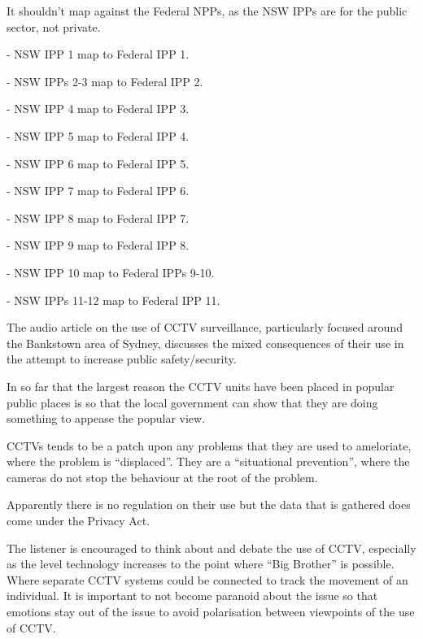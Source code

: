 
It shouldn't map against the Federal NPPs, as the NSW IPPs are for the public sector, not private.

\item - NSW IPP 1 map to Federal IPP 1.
\item - NSW IPPs 2-3 map to Federal IPP 2.
\item - NSW IPP 4 map to Federal IPP 3.
\item - NSW IPP 5 map to Federal IPP 4.
\item - NSW IPP 6 map to Federal IPP 5.
\item - NSW IPP 7 map to Federal IPP 6.
\item - NSW IPP 8 map to Federal IPP 7.
\item - NSW IPP 9 map to Federal IPP 8.
\item - NSW IPP 10 map to Federal IPPs 9-10.
\item - NSW IPPs 11-12 map to Federal IPP 11.


The audio article on the use of CCTV surveillance, particularly focused around the Bankstown area of Sydney, discusses the mixed consequences of their use in the attempt to increase public safety/security.

In so far that the largest reason the CCTV units have been placed in popular public places is so that the local government can show that they are doing something to appease the popular view.

CCTVs tends to be a patch upon any problems that they are used to ameloriate, where the problem is ``displaced''. They are a ``situational prevention'', where the cameras do not stop the behaviour at the root of the problem.

Apparently there is no regulation on their use but the data that is gathered does come under the Privacy Act.

The listener is encouraged to think about and debate the use of CCTV, especially as the level technology increases to the point where ``Big Brother'' is possible. Where separate CCTV systems could be connected to track the movement of an individual. It is important to not become paranoid about the issue so that emotions stay out of the issue to avoid polarisation between viewpoints of the use of CCTV.



